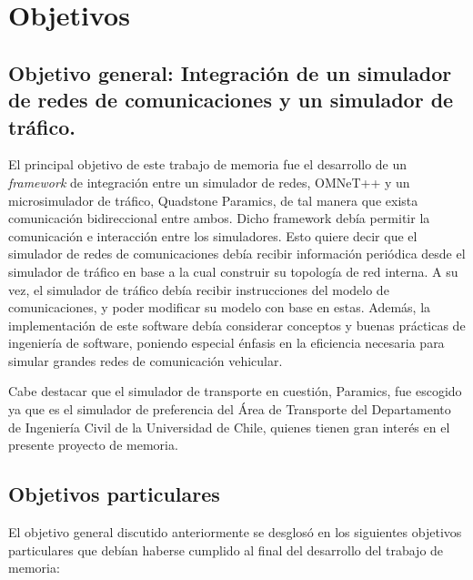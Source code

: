 \section{Objetivos}\label{sec:obj}

\subsection[Objetivo general]{Objetivo general: Integración de un simulador de redes de comunicaciones y un simulador de tráfico.}

El principal objetivo de este trabajo de memoria fue el desarrollo de un \textit{framework} de integración entre un simulador de redes, OMNeT++ y un microsimulador de tráfico, Quadstone Paramics, de tal manera que exista comunicación bidireccional entre ambos. Dicho framework debía permitir la comunicación e interacción entre los simuladores. Esto quiere decir que el simulador de redes de comunicaciones debía recibir información periódica desde el simulador de tráfico en base a la cual construir su topología de red interna. A su vez, el simulador de tráfico debía recibir instrucciones del modelo de comunicaciones, y poder modificar su modelo con base en estas.
Además, la implementación de este software debía considerar conceptos y buenas prácticas de ingeniería de software, poniendo especial énfasis en la eficiencia necesaria para simular grandes redes de comunicación vehicular.

Cabe destacar que el simulador de transporte en cuestión, Paramics, fue escogido ya que es el simulador de preferencia del Área de Transporte del Departamento de Ingeniería Civil de la Universidad de Chile, quienes tienen gran interés en el presente proyecto de memoria.


\subsection{Objetivos particulares}\label{sec:obj:part}

El objetivo general discutido anteriormente se desglosó en los siguientes objetivos particulares que debían haberse cumplido al final del desarrollo del trabajo de memoria:


